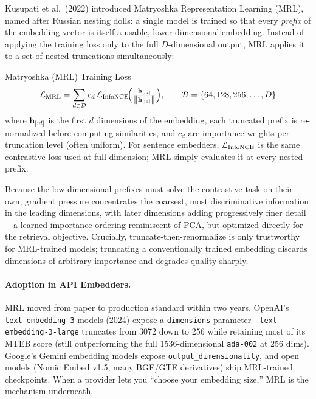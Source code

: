 Kusupati et al.\ (2022) introduced Matryoshka Representation Learning (MRL),
named after Russian nesting dolls: a single model is trained so that every
\emph{prefix} of the embedding vector is itself a usable, lower-dimensional
embedding.  Instead of applying the training loss only to the full
$D$-dimensional output, MRL applies it to a set of nested truncations
simultaneously:

\begin{mathresult}{Matryoshka (MRL) Training Loss}
\[
    \mathcal{L}_{\text{MRL}}
    = \sum_{d \in \mathcal{D}} c_d \,
      \mathcal{L}_{\text{InfoNCE}}\!\Bigl(
        \tfrac{\mathbf{h}_{[:d]}}{\left\lVert\mathbf{h}_{[:d]}\right\rVert}
      \Bigr),
    \qquad
    \mathcal{D} = \{64, 128, 256, \ldots, D\}
\]
where $\mathbf{h}_{[:d]}$ is the first $d$ dimensions of the embedding, each
truncated prefix is re-normalized before computing similarities, and $c_d$
are importance weights per truncation level (often uniform).  For sentence
embedders, $\mathcal{L}_{\text{InfoNCE}}$ is the same contrastive loss used at
full dimension; MRL simply evaluates it at every nested prefix.
\end{mathresult}

Because the low-dimensional prefixes must solve the contrastive task on
their own, gradient pressure concentrates the coarsest, most discriminative
information in the leading dimensions, with later dimensions adding
progressively finer detail---a learned importance ordering reminiscent of
PCA, but optimized directly for the retrieval objective.  Crucially,
truncate-then-renormalize is only trustworthy for MRL-trained models;
truncating a conventionally trained embedding discards dimensions of
arbitrary importance and degrades quality sharply.

\paragraph{Adoption in API Embedders.}
MRL moved from paper to production standard within two years.  OpenAI's
\texttt{text-embedding-3} models (2024) expose a \texttt{dimensions}
parameter---\texttt{text-embedding-3-large} truncates from 3072 down to 256
while retaining most of its MTEB score (still outperforming the full
1536-dimensional \texttt{ada-002} at 256 dims).  Google's Gemini embedding
models expose \texttt{output\_dimensionality}, and open models (Nomic Embed
v1.5, many BGE/GTE derivatives) ship MRL-trained checkpoints.  When a
provider lets you ``choose your embedding size,'' MRL is the mechanism
underneath.

